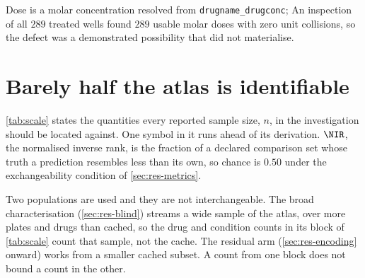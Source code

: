 \begin{figure}[htbp]
\begin{lrbox}{\tvfb}%
%
\end{lrbox}

\end{figure}


Dose is a molar concentration resolved from \texttt{drugname\_drugconc}; An inspection of all $289$ treated wells found $289$ usable molar doses
with zero unit collisions, so the defect was a demonstrated possibility that did
not materialise. 


\section{Barely half the atlas is identifiable}

\cref{tab:scale} states the quantities every reported sample size, $n$, in the investigation should be
located against. One symbol in it runs ahead of its
derivation. $\NIR$, the normalised inverse rank, is the
fraction of a declared comparison set whose truth a prediction resembles less
than its own, so chance is $0.50$ under the exchangeability condition of
\cref{sec:res-metrics}.

\begin{scopelimit}
Two populations are used and they are not interchangeable. The broad
characterisation (\cref{sec:res-blind}) streams a wide sample of the atlas, over
more plates and drugs than cached, so the drug and condition counts in its block
of \cref{tab:scale} count that sample, not the cache. The residual arm
(\cref{sec:res-encoding} onward) works from a smaller cached subset. A count
from one block does not bound a count in the other.
\end{scopelimit}

